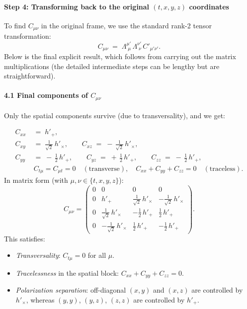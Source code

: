 \documentclass{article}
\begin{document}
\bigskip

\paragraph{Step 4: Transforming back to the original $(t,x,y,z)$ coordinates}

To find $C_{\mu\nu}$ in the original frame, we use the standard rank-2 tensor transformation:
\[
C_{\mu\nu} \;=\; \Lambda^{\mu'}_{\;\mu}\,\Lambda^{\nu'}_{\;\nu}\,C'_{\mu'\nu'}.
\]
Below is the final explicit result, which follows from carrying out the matrix multiplications (the detailed intermediate steps can be lengthy but are straightforward).

\paragraph{4.1 Final components of $C_{\mu\nu}$}

Only the spatial components survive (due to transversality), and we get:

\[
\boxed{
\begin{aligned}
C_{xx} \;&=\; h'_{+}, \\[6pt]
C_{xy} \;&=\; \frac{1}{\sqrt{2}}\,h'_{\times},
\qquad
C_{xz} \;=\; -\,\frac{1}{\sqrt{2}}\,h'_{\times}, \\[6pt]
C_{yy} \;&=\; -\,\tfrac12\,h'_{+},
\qquad
C_{yz} \;=\; +\,\tfrac12\,h'_{+},
\qquad
C_{zz} \;=\; -\,\tfrac12\,h'_{+}, \\[6pt]
& C_{t\mu} = C_{\mu t} = 0 \quad (\text{transverse}),
\quad
C_{xx}+C_{yy}+C_{zz} = 0 \quad (\text{traceless}).
\end{aligned}
}
\]
In matrix form (with $\mu,\nu\in\{t,x,y,z\}$):
\[
C_{\mu\nu}
=
\begin{pmatrix}
0 & 0 & 0 & 0\\[6pt]
0 & h'_+
  & \tfrac{1}{\sqrt{2}}\,h'_{\times}
  & -\tfrac{1}{\sqrt{2}}\,h'_{\times} \\[6pt]
0 & \tfrac{1}{\sqrt{2}}\,h'_{\times}
  & -\tfrac12\,h'_{+}
  & \tfrac12\,h'_{+} \\[6pt]
0 & -\tfrac{1}{\sqrt{2}}\,h'_{\times}
  & \tfrac12\,h'_{+}
  & -\tfrac12\,h'_{+}
\end{pmatrix}.
\]
This satisfies:
\begin{itemize}
  \item \textit{Transversality}: $C_{t\mu} = 0$ for all $\mu$.
  \item \textit{Tracelessness} in the spatial block: $C_{xx}+C_{yy}+C_{zz}=0$.
  \item \textit{Polarization separation}: off-diagonal $(x,y)$ and $(x,z)$ are controlled by $h'_{\times}$, whereas $(y,y)$, $(y,z)$, $(z,z)$ are controlled by $h'_+$.
\end{itemize}
\end{document}
